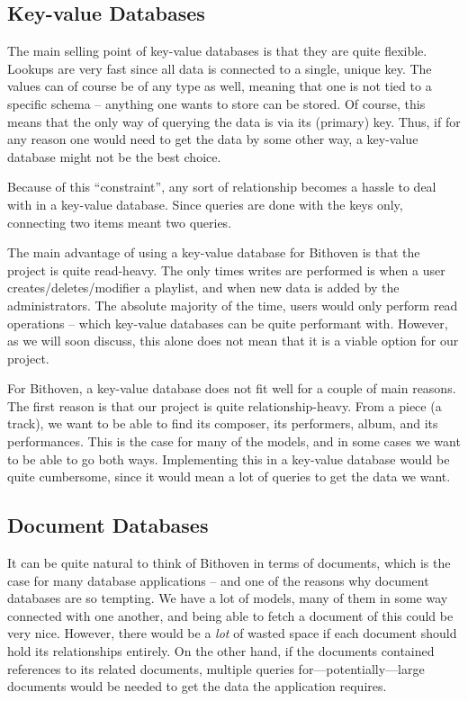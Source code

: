 \subsection{Key-value Databases}
\label{analysis-kv-db}
The main selling point of key-value databases is that they are quite flexible.
Lookups are very fast since all data is connected to a single, unique key. The
values can of course be of any type as well, meaning that one is not tied to a
specific schema -- anything one wants to store can be stored. Of course, this
means that the only way of querying the data is via its (primary) key. Thus, if
for any reason one would need to get the data by some other way, a key-value
database might not be the best choice.

Because of this ``constraint'', any sort of relationship becomes a hassle to
deal with in a key-value database. Since queries are done with the keys only,
connecting two items meant two queries.

The main advantage of using a key-value database for Bithoven is that the
project is quite read-heavy. The only times writes are performed is when a user
creates/deletes/modifier a playlist, and when new data is added by the
administrators. The absolute majority of the time, users would only perform read
operations -- which key-value databases can be quite performant with. However,
as we will soon discuss, this alone does not mean that it is a viable option for
our project.

For Bithoven, a key-value database does not fit well for a couple of main
reasons. The first reason is that our project is quite relationship-heavy. From
a piece (a track), we want to be able to find its composer, its performers,
album, and its performances. This is the case for many of the models, and in
some cases we want to be able to go both ways. Implementing this in a key-value
database would be quite cumbersome, since it would mean a lot of queries to get
the data we want.

\subsection{Document Databases}
\label{analysis-doc-db}

It can be quite natural to think of Bithoven in terms of documents, which is the
case for many database applications -- and one of the reasons why document
databases are so tempting. We have a lot of models, many of them in some way
connected with one another, and being able to fetch a document of this could be
very nice. However, there would be a \emph{lot} of wasted space if each document
should hold its relationships entirely. On the other hand, if the documents
contained references to its related documents, multiple queries
for---potentially---large documents would be needed to get the data the
application requires. 

